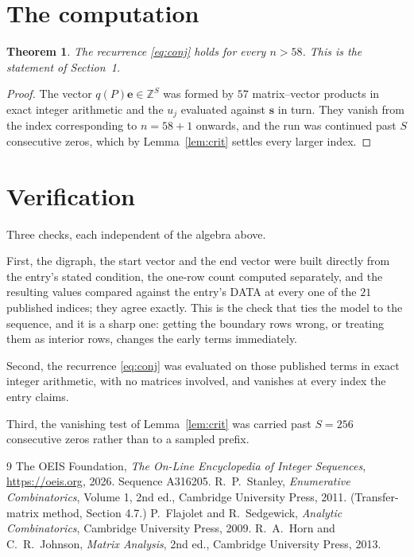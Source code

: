 \documentclass[11pt,a4paper]{article}
\theoremstyle{plain}
\newtheorem{theorem}{Theorem}
\theoremstyle{definition}
\begin{document}
\section{The computation}

\begin{theorem}
The recurrence \eqref{eq:conj} holds for every $n>58$. This is the statement of
Section~1.
\end{theorem}

\begin{proof}
The vector $q(P)\mathbf{e}\in\mathbb{Z}^{S}$ was formed by $57$ matrix--vector
products in exact integer arithmetic and the $u_j$ evaluated against $\mathbf{s}$ in turn.
They vanish from the index corresponding to $n=58+1$ onwards, and the run was continued
past $S$ consecutive zeros, which by Lemma~\ref{lem:crit} settles every larger index.
\end{proof}

\section{Verification}

Three checks, each independent of the algebra above.

First, the digraph, the start vector and the end vector were built directly from the
entry's stated condition, the one-row count computed separately, and the resulting values
compared against the entry's DATA at every one of the $21$ published indices; they
agree exactly. This is the check that ties the model to the sequence, and it is a sharp one:
getting the boundary rows wrong, or treating them as interior rows, changes the early terms
immediately.

Second, the recurrence \eqref{eq:conj} was evaluated on those published terms in exact
integer arithmetic, with no matrices involved, and vanishes at every index the entry claims.

Third, the vanishing test of Lemma~\ref{lem:crit} was carried past $S=256$ consecutive
zeros rather than to a sampled prefix.

\begin{thebibliography}{9}
 The OEIS Foundation, \emph{The On-Line Encyclopedia of Integer
Sequences}, \url{https://oeis.org}, 2026. Sequence A316205.
 R.~P.~Stanley, \emph{Enumerative Combinatorics}, Volume 1, 2nd ed.,
Cambridge University Press, 2011. (Transfer-matrix method, Section 4.7.)
 P.~Flajolet and R.~Sedgewick, \emph{Analytic Combinatorics}, Cambridge
University Press, 2009.
 R.~A.~Horn and C.~R.~Johnson, \emph{Matrix Analysis}, 2nd ed., Cambridge
University Press, 2013.
\end{thebibliography}
\end{document}
